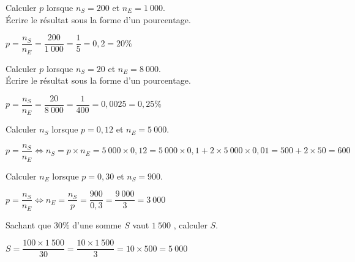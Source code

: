 \documentclass[11pt,a4paper]{article}  %
\begin{document}
\vspace*{-0.4cm}
\begin{enumMet}
	\item Calculer $p$ lorsque $n_S = 200$ et $n_E = 1\ 000$.\\
	Écrire le résultat sous la forme d'un pourcentage.
	\begin{corrBox}
		$p=\dfrac{n_S}{n_E}=\dfrac{200}{1\ 000}=\dfrac{1}{5}=0,2=20\%$		
	\end{corrBox}
	\item Calculer $p$ lorsque $n_S = 20$ et $n_E= 8\ 000$.\\
	Écrire le résultat sous la forme d'un pourcentage.
	\begin{corrBox}
		$p=\dfrac{n_S}{n_E}=\dfrac{20}{8\ 000}=\dfrac{1}{400}=0,0025=0,25\%$		
	\end{corrBox}
	\item Calculer $n_S$ lorsque $p = 0,12$ et $n_E= 5\ 000$.
	\begin{corrBox}
		$p=\dfrac{n_S}{n_E} \iff n_S=p\times n_E=5\ 000\times 0,12=5\ 000\times 0,1+2\times 5\ 000\times 0,01=500+2\times 50=600$		
	\end{corrBox}
	\item Calculer $n_E$ lorsque $p = 0,30$ et $n_S = 900$.
	\begin{corrBox}
		$p=\dfrac{n_S}{n_E} \iff n_E=\dfrac{n_S}{p}=\dfrac{900}{0,3}=\dfrac{9\ 000}{3}=3\ 000$		
	\end{corrBox}
	\item Sachant que $30 \%$ d'une somme $S$ vaut $1\ 500$ \EUR{}, calculer $S$.
	\begin{corrBox}
		$S=\dfrac{100\times 1\ 500}{30}=\dfrac{10\times 1\ 500}{3}=10\times 500=5\ 000$		
	\end{corrBox}
\end{enumMet}
\end{document}
